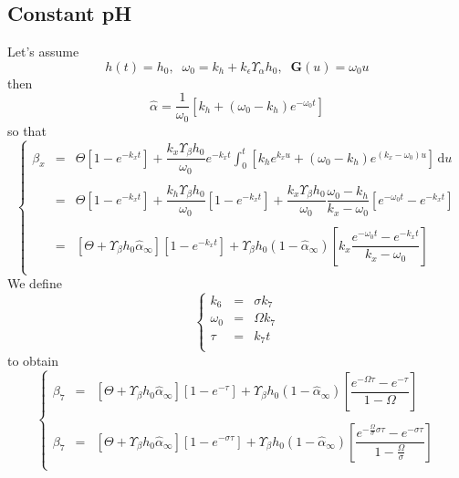 \documentclass[aps,onecolumn,12pt]{revtex4}
\newcommand{\ig}{\ensuremath{\mathbf{G}}}
\begin{document}
\subsection{Constant pH}
Let's assume
\begin{equation}
	h(t) = h_0, \;\;\omega_0 = k_h + k_\epsilon \Upsilon_\alpha h_0,\;\; \ig(u) = \omega_0 u
\end{equation}
then
\begin{equation}
	\hat\alpha = \dfrac{1}{\omega_0} \left[ k_h + \left(\omega_0-k_h\right)e^{-\omega_0 t}\right]
\end{equation}
so that
\begin{equation}
\left\lbrace
\begin{array}{rcl}
	\beta_x & = & \displaystyle \Theta \left[ 1-e^{-k_x t} \right] + \dfrac{k_x \Upsilon_\beta h_0 }{\omega_0} e^{-k_xt} 
	\int_0^t \left[ k_h e^{k_xu} + \left(\omega_0-k_h\right)e^{ (k_x-\omega_0) u} \right] \,\mathrm{d} u  \\
	\\
	& = & \displaystyle \Theta \left[ 1-e^{-k_x t} \right] + \dfrac{k_h \Upsilon_\beta h_0 }{\omega_0}\left[ 1-e^{-k_x t} \right]
	+ \dfrac{k_x \Upsilon_\beta h_0 }{\omega_0} \dfrac{\omega_0-k_h}{k_x-\omega_0} \left[ e^{-\omega_0t} - e^{-k_xt}\right]\\
	\\
	& = & \left[\Theta + \Upsilon_\beta h_0 \hat\alpha_\infty \right]\left[ 1-e^{-k_x t} \right] 
	+ \Upsilon_\beta h_0 \left(1-\hat\alpha_\infty\right) \left[ k_x \dfrac{e^{-\omega_0t} - e^{-k_xt}}{k_x-\omega_0}\right]
	 \\
\end{array}
\right.
\end{equation}
We define
\begin{equation}
\left\lbrace
\begin{array}{rcl}
	k_6 & = & \sigma k_7 \\
	\omega_0 & = & \Omega k_7\\
	\tau & = & k_7 t \\
\end{array}
\right.
\end{equation}
to obtain
\begin{equation}
\left\lbrace
\begin{array}{rcl}
	\beta_7 & = & 
	\left[\Theta + \Upsilon_\beta h_0 \hat\alpha_\infty \right] \left[1-e^{-\tau}\right] 
	+
	\Upsilon_\beta h_0 \left(1-\hat\alpha_\infty\right) \left[ \dfrac{e^{-\Omega\tau} - e^{-\tau}}{1-\Omega}\right]
	\\
	\\
	\beta_7 & = & 
	\left[\Theta + \Upsilon_\beta h_0 \hat\alpha_\infty \right] \left[1-e^{-\sigma\tau}\right] 
	+
	\Upsilon_\beta h_0 \left(1-\hat\alpha_\infty\right)
	\left[  \dfrac{e^{-\frac{\Omega}{\sigma} \sigma \tau } - e^{-\sigma\tau}}{1-\frac{\Omega}{\sigma}}\right]
	\\
\end{array}
\right.
\end{equation}
\end{document}
